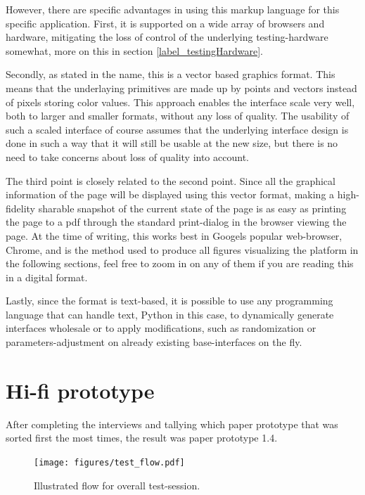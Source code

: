 {  However, there are specific advantages in using this markup language for this
  specific application. First, it is supported on a wide array of browsers and
  hardware, mitigating the loss of control of the underlying testing-hardware
  somewhat, more on this in section \ref{label_testingHardware}.

  Secondly, as stated in the name, this is a vector based graphics format.
  This means that the underlaying primitives are made up by  points and vectors
  instead of pixels storing color values. This approach enables the interface
  scale very well, both to larger and smaller formats, without any loss of
  quality. The usability of such a scaled interface of course assumes that the
  underlying interface design is done in such a way that it will still be
  usable at the new size, but there is no need to take concerns about loss of
  quality into account.

  The third point is closely related to the second point. Since all the
  graphical information of the page will be displayed using this vector format,
  making a high-fidelity sharable snapshot of the current state of the page is
  as easy as printing the page to a pdf through the standard print-dialog in
  the browser viewing the page. At the time of writing, this works best
  in Googels popular web-browser, Chrome, and is the method used to produce all
  figures visualizing the platform in the following sections, feel free to zoom
  in on any of them if you are reading this in a digital format.

  Lastly, since the format is text-based, it is possible to use any programming
  language that can handle text, Python in this case, to dynamically generate
  interfaces wholesale or to apply modifications, such as randomization or
  parameters-adjustment on already existing base-interfaces on the fly.


\section{Hi-fi prototype}

After completing the interviews and tallying which paper prototype that
was sorted first the most times, the result was paper prototype 1.4.

  \begin{figure}[h!]
    \centering
    \texttt{[image: figures/test\_flow.pdf]}
    \caption{Illustrated flow for overall test-session.}
  \end{figure}

}
